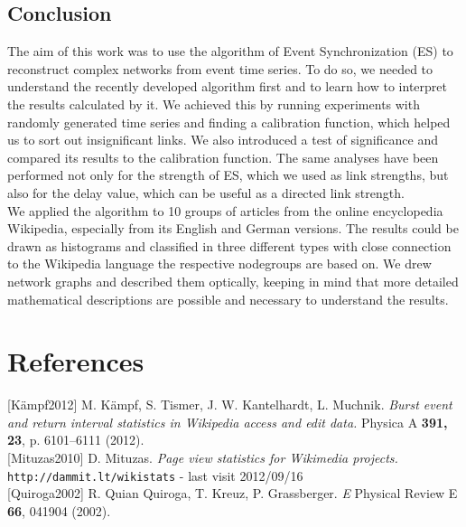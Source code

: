 \documentclass[a4paper,12pt,twoside]{article}
\newcommand{\blankpage}{ %
\newpage
\thispagestyle{empty}
\mbox{}
\newpage
}
\begin{document}
\subsection{Conclusion}
The aim of this work was to use the algorithm of Event Synchronization (ES) to reconstruct complex networks from event time series. To do so, we needed to understand the recently developed algorithm first and to learn how to interpret the results calculated by it. We achieved this by running experiments with randomly generated time series and finding a calibration function, which helped us to sort out insignificant links. We also introduced a test of significance and compared its results to the calibration function. The same analyses have been performed not only for the strength of ES, which we used as link strengths, but also for the delay value, which can be useful as a directed link strength.\\
We applied the algorithm to 10 groups of articles from the online encyclopedia Wikipedia, especially from its English and German versions. The results could be drawn as histograms and classified in three different types with close connection to the Wikipedia language the respective nodegroups are based on. We drew network graphs and described them optically, keeping in mind that more detailed mathematical descriptions are possible and necessary to understand the results.
%
\rhead[]{}
\blankpage
\section*{References}
[{\sc Kämpf}2012] {\sc M. Kämpf, S. Tismer, J. W. Kantelhardt, L. Muchnik.} \emph{Burst event and return interval statistics in Wikipedia access and edit data.} Physica A {\bf 391, 23}, p. 6101–6111 (2012).\\[6pt]

[{\sc Mituzas}2010] {\sc D. Mituzas.} \emph{Page view statistics for Wikimedia projects.}\\{\tt http://dammit.lt/wikistats} - last visit 2012/09/16 \\[6pt]


[{\sc Quiroga}2002] {\sc R. Quian Quiroga, T. Kreuz, P. Grassberger}. \emph{E} Physical Review E {\bf 66}, 041904 (2002).\\[6pt]
\end{document}

